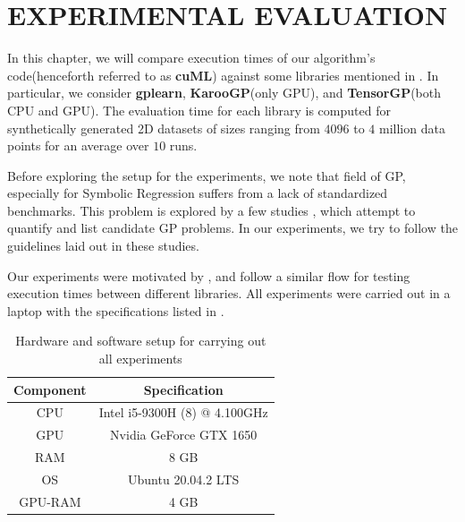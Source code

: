 \chapter{EXPERIMENTAL EVALUATION}
\label{chap:experiments}

In this chapter, we will compare execution times of our algorithm's code(henceforth referred to as \textbf{cuML}) against some libraries mentioned in .
In particular, we consider \textbf{gplearn}\citep{gplearn}, \textbf{KarooGP}\citep{staats2017tensorflow}(only GPU), and \textbf{TensorGP}\citep{baeta2021tensorgp}(both CPU and GPU). 
The evaluation time for each library is computed for synthetically generated 2D datasets of sizes ranging from $4096$ to $4$ million data points for an average over $10$ runs. 

Before exploring the setup for the experiments, we note that field of GP, especially for Symbolic Regression suffers from a lack of standardized benchmarks. This problem is explored by a few studies \citep{GP_Better_Benchmarks}\citep{Orzechowski_2018}, which attempt to quantify and list candidate GP problems. In our experiments, we try to follow the guidelines laid out in these studies.

Our experiments were motivated by \citep{baeta2021speed}, and follow a similar flow for testing execution times between different libraries. All experiments were carried out in a laptop with the specifications listed in .

\begin{table}[htbp]
  \caption{Hardware and software setup for carrying out all experiments}
  \begin{center}
      \begin{tabular}[c]{cc}%
        \toprule
        \textbf{Component} &   \textbf{Specification} \\
        \midrule
        CPU & Intel i5-9300H (8) @ 4.100GHz \\
        GPU & Nvidia GeForce GTX 1650       \\
        RAM & 8 GB                          \\
        OS  & Ubuntu 20.04.2 LTS            \\
        GPU-RAM& 4 GB          \\
        \bottomrule
      \end{tabular}
      \label{tab:laptop}
  \end{center}
\end{table}

